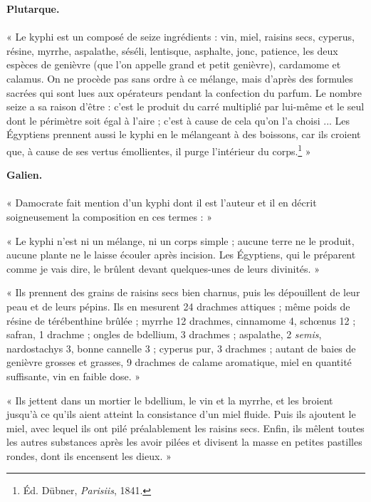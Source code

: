 \documentclass[a4paper, 11pt, oneside, landscape]{article}
\begin{document}
\bigskip

\begin{center}
\textbf{Plutarque.}
\end{center}
\paragraph{}
« Le kyphi est un composé de seize ingrédients : vin, miel, raisins secs, cyperus, résine, myrrhe, aspalathe, séséli, lentisque, asphalte, jonc, patience, les deux espèces de genièvre (que l'on appelle grand et petit genièvre), cardamome et calamus. On ne procède pas sans ordre à ce mélange, mais d'après des formules sacrées qui sont lues aux opérateurs pendant la confection du parfum. Le nombre seize a sa raison d'être : c'est le produit du carré multiplié par lui-même et le seul dont le périmètre soit égal à l'aire ; c'est à cause de cela qu'on l'a choisi ... Les Égyptiens prennent aussi le kyphi en le mélangeant à des boissons, car ils croient que, à cause de ses vertus émollientes, il purge l'intérieur du corps.\footnote{Éd. Dübner, \emph{Parisiis}, 1841.} »

\bigskip

\begin{center}
\textbf{Galien.}
\end{center}
\paragraph{}
« Damocrate fait mention d'un kyphi dont il est l'auteur et il en décrit soigneusement la composition en ces termes : »

« Le kyphi n'est ni un mélange, ni un corps simple ; aucune terre ne le produit, aucune plante ne le laisse écouler après incision. Les Égyptiens, qui le préparent comme je vais dire, le brûlent devant quelques-unes de leurs divinités. »

« Ils prennent des grains de raisins secs bien charnus, puis les dépouillent de leur peau et de leurs pépins. Ils en mesurent 24 drachmes attiques ; même poids de résine de térébenthine brûlée ; myrrhe 12 drachmes, cinnamome 4, schœnus 12 ; safran, 1 drachme ; ongles de bdellium, 3 drachmes ; aspalathe, 2 \emph{semis}, nardostachys 3, bonne cannelle 3 ; cyperus pur, 3 drachmes ; autant de baies de genièvre grosses et grasses, 9 drachmes de calame aromatique, miel en quantité suffisante, vin en faible dose. »

« Ils jettent dans un mortier le bdellium, le vin et la myrrhe, et les broient jusqu'à ce qu'ils aient atteint la consistance d'un miel fluide. Puis ils ajoutent le miel, avec lequel ils ont pilé préalablement les raisins secs. Enfin, ils mêlent toutes les autres substances après les avoir pilées et divisent la masse en petites pastilles rondes, dont ils encensent les dieux. »
\end{document}
